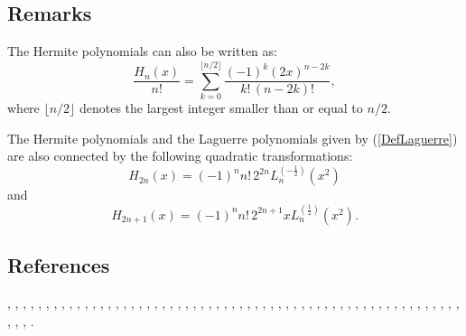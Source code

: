 \documentclass[envcountchap,graybox]{svmono}
\begin{document}
\subsection*{Remarks}
The Hermite polynomials can also be written as:
$$\frac{H_n(x)}{n!}=\sum_{k=0}^{\lfloor n/2\rfloor}
\frac{(-1)^k(2x)^{n-2k}}{k!\,(n-2k)!},$$
where $\lfloor n/2\rfloor$ denotes the largest integer smaller than or equal to $n/2$.

\noindent
The Hermite polynomials and the Laguerre polynomials given by (\ref{DefLaguerre}) are also
connected by the following quadratic transformations:
$$H_{2n}(x)=(-1)^nn!\,2^{2n}L_n^{(-\frac{1}{2})}(x^2)$$
and
$$H_{2n+1}(x)=(-1)^nn!\,2^{2n+1}xL_n^{(\frac{1}{2})}(x^2).$$

\subsection*{References}
\cite{Abram}, \cite{NAlSalam66}, \cite{AlSalam90}, \cite{AlSalamChihara72},
\cite{AlSalamChihara76}, \cite{AndrewsAskey85}, \cite{AndrewsAskeyRoy}, \cite{Area+I}, 
\cite{Askey68}, \cite{Askey75}, \cite{Askey89I}, \cite{AskeyGasper76}, \cite{AskeyWilson85}, 
\cite{Azor}, \cite{Berg}, \cite{BilodeauII}, \cite{Brafman51}, \cite{Brafman57II}, 
\cite{Brenke}, \cite{CarlitzSrivastava}, \cite{ChenSrivastava}, \cite{Chihara78}, 
\cite{Cohen}, \cite{Danese}, \cite{DetteStudden92}, \cite{DetteStudden95}, \cite{Doha2004I},
\cite{Erdelyi+}, \cite{Faldey}, \cite{Gawronski87}, \cite{Gawronski93}, \cite{Gillis+},
\cite{Godoy+}, \cite{Grad}, \cite{Ismail74}, \cite{Ismail2005II}, \cite{IsmailStanton97},
\cite{Koekoek2000}, \cite{Koorn88}, \cite{Krasikov2004}, \cite{Kwon+}, \cite{LabelleYehIII},
\cite{Lesky95II}, \cite{Lesky96}, \cite{LewanowiczI}, \cite{LopezTemme99}, \cite{Mathai},
\cite{Meixner}, \cite{Nikiforov+}, \cite{NikiforovUvarov}, \cite{Olver}, \cite{Pittaluga},
\cite{Rainville}, \cite{SainteViennot}, \cite{Srivastava71}, \cite{SrivastavaMathur},
\cite{Szego75}, \cite{Temme}, \cite{TemmeLopez2000}, \cite{Trickovic}, \cite{Viennot},
\cite{Weisner59}, \cite{Wyman}.
\end{document}
